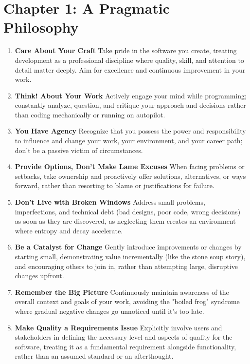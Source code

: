 \documentclass[11pt]{article}
\begin{document}
\section*{Chapter 1: A Pragmatic Philosophy}
\begin{enumerate}[label=\arabic*., itemsep=1ex] %
    \item \textbf{Care About Your Craft}
    Take pride in the software you create, treating development as a professional discipline where quality, skill, and attention to detail matter deeply. Aim for excellence and continuous improvement in your work.

    \item \textbf{Think! About Your Work}
    Actively engage your mind while programming; constantly analyze, question, and critique your approach and decisions rather than coding mechanically or running on autopilot.

    \item \textbf{You Have Agency}
    Recognize that you possess the power and responsibility to influence and change your work, your environment, and your career path; don't be a passive victim of circumstances.

    \item \textbf{Provide Options, Don’t Make Lame Excuses}
    When facing problems or setbacks, take ownership and proactively offer solutions, alternatives, or ways forward, rather than resorting to blame or justifications for failure.

    \item \textbf{Don’t Live with Broken Windows}
    Address small problems, imperfections, and technical debt (bad designs, poor code, wrong decisions) as soon as they are discovered, as neglecting them creates an environment where entropy and decay accelerate.

    \item \textbf{Be a Catalyst for Change}
    Gently introduce improvements or changes by starting small, demonstrating value incrementally (like the stone soup story), and encouraging others to join in, rather than attempting large, disruptive changes upfront.

    \item \textbf{Remember the Big Picture}
    Continuously maintain awareness of the overall context and goals of your work, avoiding the "boiled frog" syndrome where gradual negative changes go unnoticed until it's too late.

    \item \textbf{Make Quality a Requirements Issue}
    Explicitly involve users and stakeholders in defining the necessary level and aspects of quality for the software, treating it as a fundamental requirement alongside functionality, rather than an assumed standard or an afterthought.


\end{enumerate}
\end{document}
